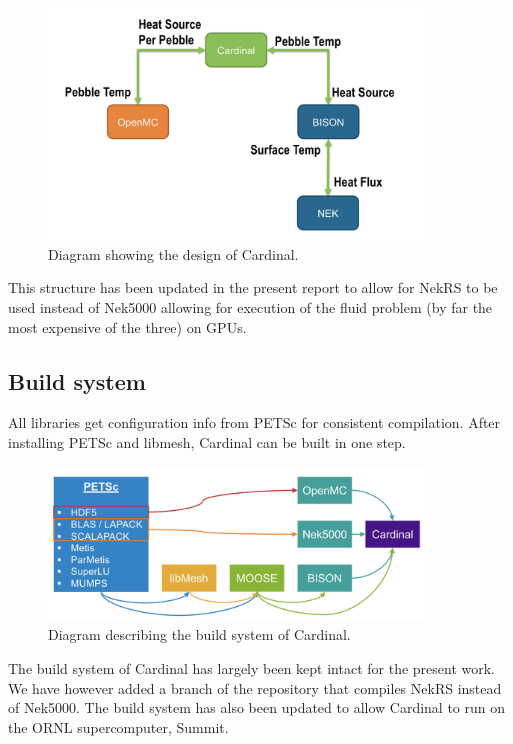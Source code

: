 \begin{figure}[htb!]
\centering
\includegraphics[width=0.9\textwidth]{Figures/cardinal}
\caption{Diagram showing the design of Cardinal.}
\label{f:cardinal}
\end{figure}

This structure has been updated in the present report to allow for NekRS to be used instead of Nek5000 allowing for execution of the fluid problem (by far the most expensive of the three) on GPUs.

\subsection{Build system}
\label{ss:c2}

All libraries get configuration info from PETSc for consistent compilation.
After installing PETSc and libmesh, Cardinal can be built in one step.

\begin{figure}[htbp!]
\centering
\includegraphics[width=0.9\textwidth]{Figures/build}
\caption{Diagram describing the build system of Cardinal.}
\label{f:build}
\end{figure}

The build system of Cardinal has largely been kept intact for the present work.
We have however added a branch of the repository that compiles NekRS instead of Nek5000.
The build system has also been updated to allow Cardinal to run on the ORNL supercomputer, Summit.

